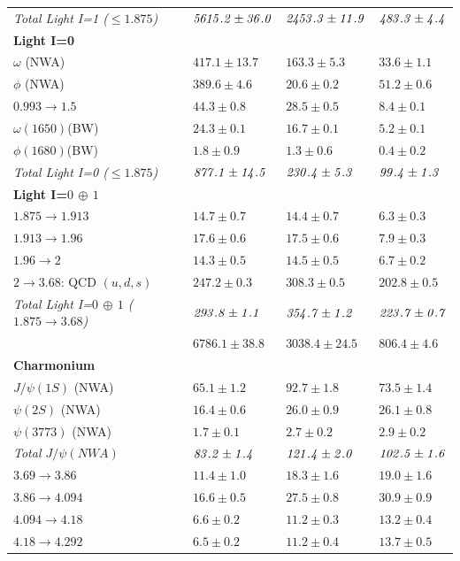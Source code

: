 \documentclass[review]{elsarticle}
\begin{document}
{\begin{table}[H]
\begin{center}
{\begin{tabular}{| llll |}
{\it Total Light I=1 ($\leq 1.875$)}&$\it 5615.2\pm 36.0$&$\it 2453.3\pm 11.9$&$\it 483.3\pm 4.4$\\
{\bf Light I=0}&&&\\
$\omega$ (NWA) &$417.1\pm 13.7$&$163.3\pm 5.3$&$33.6\pm 1.1$\\
$\phi$ (NWA) &$389.6\pm 4.6$&$20.6\pm 0.2$&$51.2\pm 0.6$\\
$0.993\to 1.5$ & $44.3\pm 0.8$&$28.5\pm 0.5$&$8.4\pm 0.1$\\
$\omega(1650)$(BW)&$24.3\pm 0.1$&$16.7\pm 0.1$&$5.2\pm 0.1$ \\
$\phi(1680)$(BW)&$1.8\pm 0.9$&$1.3\pm 0.6$&$0.4\pm 0.2$ \\
{\it Total Light I=0 ($\leq 1.875$)}&$\it 877.1\pm 14.5$&$\it 230.4\pm 5.3$&$\it 99.4\pm 1.3$\\
{\bf Light I=\boldmath $0\, \oplus \,1$}&&&\\
$1.875\to 1.913$ & $14.7\pm 0.7$&$14.4\pm 0.7$&$6.3\pm 0.3$\\
$1.913\to 1.96$ & $17.6\pm 0.6$&$17.5\pm 0.6$&$7.9\pm 0.3$\\
$1.96\to 2$ & $14.3\pm 0.5$&$14.5\pm 0.5$&$6.7\pm 0.2$\\
$2\to 3.68$:  QCD $(u,d,s)$ & $247.2\pm 0.3$&$308.3\pm 0.5$&$202.8\pm 0.5$\\
{\it Total Light I=$0\, \oplus \,1$ ($1.875\to 3.68$)}&$\it 293.8\pm 1.1$&$\it 354.7\pm 1.2$&$\it 223.7\pm 0.7$\\
\rowcolor{greenli}{ Total Light I=$0\, \oplus \,1$ ($2m_\pi\to3.68$)}&$ 6786.1\pm 38.8$&$3038.4\pm 24.5$&$806.4\pm 4.6$\\
{\bf Charmonium} &&&\\
$J/\psi (1S)$ (NWA) &$65.1\pm 1.2$&$92.7\pm 1.8$&$73.5\pm 1.4$\\
$\psi (2S)$ (NWA) &$16.4\pm 0.6$&$26.0\pm 0.9$&$26.1\pm 0.8$\\
$\psi (3773)$ (NWA) &$1.7\pm 0.1$&$2.7\pm 0.2$&$2.9\pm 0.2$\\
{\it Total $J/\psi (NWA)$} &$\it 83.2\pm 1.4$&$\it 121.4\pm 2.0$&$\it 102.5\pm 1.6$\\
$3.69\to 3.86$ & $11.4\pm 1.0$&$18.3\pm 1.6$&$19.0\pm 1.6$\\
$3.86\to4.094$ & $16.6\pm 0.5$&$27.5\pm 0.8$&$30.9\pm 0.9$\\
$4.094\to4.18$ & $6.6\pm 0.2$&$11.2\pm 0.3$&$13.2\pm 0.4$\\
$4.18\to4.292$ & $6.5\pm 0.2$&$11.2\pm 0.4$&$13.7\pm 0.5$\\

\end{tabular}}
\end{center}
\end{table}}
\end{document}
